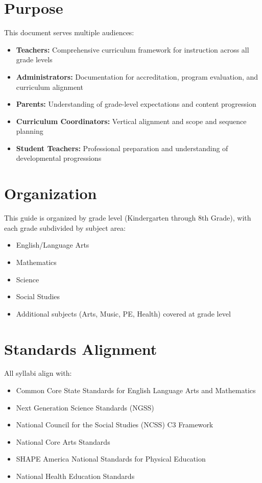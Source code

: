 \documentclass[11pt,letterpaper]{report}
\begin{document}
\section*{Purpose}

This document serves multiple audiences:

\begin{itemize}
    \item \textbf{Teachers:} Comprehensive curriculum framework for instruction across all grade levels
    \item \textbf{Administrators:} Documentation for accreditation, program evaluation, and curriculum alignment
    \item \textbf{Parents:} Understanding of grade-level expectations and content progression
    \item \textbf{Curriculum Coordinators:} Vertical alignment and scope and sequence planning
    \item \textbf{Student Teachers:} Professional preparation and understanding of developmental progressions
\end{itemize}

\section*{Organization}

This guide is organized by grade level (Kindergarten through 8th Grade), with each grade subdivided by subject area:

\begin{itemize}
    \item English/Language Arts
    \item Mathematics
    \item Science
    \item Social Studies
    \item Additional subjects (Arts, Music, PE, Health) covered at grade level
\end{itemize}

\section*{Standards Alignment}

All syllabi align with:

\begin{itemize}
    \item Common Core State Standards for English Language Arts and Mathematics
    \item Next Generation Science Standards (NGSS)
    \item National Council for the Social Studies (NCSS) C3 Framework
    \item National Core Arts Standards
    \item SHAPE America National Standards for Physical Education
    \item National Health Education Standards
\end{itemize}
\end{document}
